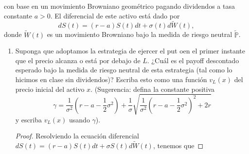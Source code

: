 \documentclass[letterpaper]{article}
\renewcommand{\P}{\mathbb{P}}
\newcommand{\1}{\mathds{1}}
\theoremstyle{definition}
\theoremstyle{definition}
\theoremstyle{definition}
\theoremstyle{definition}
\theoremstyle{definition}
\begin{document}
\begin{itemize}
    con base en un movimiento Browniano geométrico pagando dividendos a tasa constante $a>0$. El diferencial 
    de este activo está dado por 
    \[
    dS(t)=(r-a)S(t)dt+\sigma(t)d\widetilde{W}(t), 
    \]
    donde $\widetilde{W}(t)$ es un movimiento Browniano bajo la medida de riesgo neutral $\widetilde{\P}$.
    \begin{enumerate}
        \item Suponga que adoptamos la estrategia de ejercer el put oen el primer instante 
        que el precio alcanza o está por debajo de $L$. ¿Cuál es el payoff descontado 
        esperado bajo la medida de riesgo neutral de esta estrategia (tal como lo hicimos en clase 
        sin dividendos)? Escriba esto como una función $v_L(x)$ del precio inicial del activo $x$. 
        (Sugerencia: defina la constante positiva 
        \[
            \gamma=\frac{1}{\sigma^2}\left(r-a-\frac{1}{2}\sigma^2\right)+\frac{1}{\sigma}\sqrt{\frac{1}{\sigma^2}\left(r-a-\frac{1}{2}\sigma^2\right)^2+2r}
        \]
        y escriba $v_L(x)$ usando $\gamma$).
        \begin{proof} 
          Resolviendo la ecuación diferencial $dS(t)=(r-a)S(t)dt+\sigma S(t)d\widetilde{W}(t)$, tenemos que 
          

\end{proof}
\end{enumerate}
\end{itemize}
\end{document}

